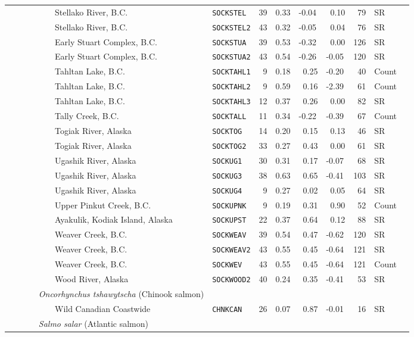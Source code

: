 \begin{flushleft}
\begin{tabular*}{7.1in}{llllllllll}
&~~~~~~~~~Stellako River, B.C.&{\tt SOCKSTEL}&39&0.33&-0.04&~0.10&~79&SR  & \\ 
&~~~~~~~~~Stellako River, B.C.&{\tt SOCKSTEL2}&43&0.32&-0.05&~0.04&~76&SR  & \\ 
&~~~~~~~~~Early Stuart Complex, B.C.&{\tt SOCKSTUA}&39&0.53&-0.32&~0.00&126&SR  & \\ 
&~~~~~~~~~Early Stuart Complex, B.C.&{\tt SOCKSTUA2}&43&0.54&-0.26&-0.05&120&SR  & \\ 
&~~~~~~~~~Tahltan Lake, B.C.&{\tt SOCKTAHL1}&~9&0.18&~0.25&-0.20&~40&Count  & \\ 
&~~~~~~~~~Tahltan Lake, B.C.&{\tt SOCKTAHL2}&~9&0.59&~0.16&-2.39&~61&Count  & \\ 
&~~~~~~~~~Tahltan Lake, B.C.&{\tt SOCKTAHL3}&12&0.37&~0.26&~0.00&~82&SR  & \\ 
&~~~~~~~~~Tally Creek, B.C.&{\tt SOCKTALL}&11&0.34&-0.22&-0.39&~67&Count  & \\ 
&~~~~~~~~~Togiak River, Alaska&{\tt SOCKTOG}&14&0.20&~0.15&~0.13&~46&SR  & \\ 
&~~~~~~~~~Togiak River, Alaska&{\tt SOCKTOG2}&33&0.27&~0.43&~0.00&~61&SR  & \\ 
&~~~~~~~~~Ugashik River, Alaska&{\tt SOCKUG1}&30&0.31&~0.17&-0.07&~68&SR  & \\ 
&~~~~~~~~~Ugashik River, Alaska&{\tt SOCKUG3}&38&0.63&~0.65&-0.41&103&SR  & \\ 
&~~~~~~~~~Ugashik River, Alaska&{\tt SOCKUG4}&~9&0.27&~0.02&~0.05&~64&SR  & \\ 
&~~~~~~~~~Upper Pinkut Creek, B.C.&{\tt SOCKUPNK}&~9&0.19&~0.31&~0.90&~52&Count  & \\ 
&~~~~~~~~~Ayakulik, Kodiak Island, Alaska&{\tt SOCKUPST}&22&0.37&~0.64&~0.12&~88&SR  & \\ 
&~~~~~~~~~Weaver Creek, B.C.&{\tt SOCKWEAV}&39&0.54&~0.47&-0.62&120&SR  & \\ 
&~~~~~~~~~Weaver Creek, B.C.&{\tt SOCKWEAV2}&43&0.55&~0.45&-0.64&121&SR  & \\ 
&~~~~~~~~~Weaver Creek, B.C.&{\tt SOCKWEV}&43&0.55&~0.45&-0.64&121&Count  & \\ 
&~~~~~~~~~Wood River, Alaska&{\tt SOCKWOOD2}&40&0.24&~0.35&-0.41&~53&SR  & \\ 
&{\it~~~~~Oncorhynchus tshawytscha} (Chinook salmon)&~&~&~&~&~&~&~  & \\ 
&~~~~~~~~~Wild Canadian Coastwide&{\tt CHNKCAN}&26&0.07&~0.87&-0.01&~16&SR  & \\ 
&{\it~~~~~Salmo salar} (Atlantic salmon)&~&~&~&~&~&~&~  & \\ 

\end{tabular*}
\end{flushleft}
